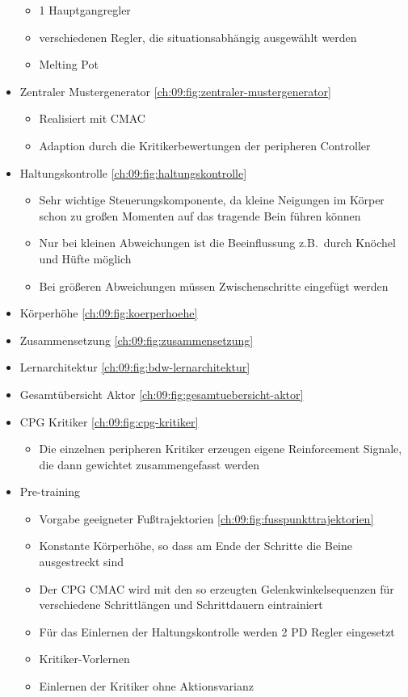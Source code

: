 \begin{itemize}
	\begin{itemize}
		\item 1 Hauptgangregler
		\item verschiedenen Regler, die situationsabhängig ausgewählt werden
		\item Melting Pot
	\end{itemize}
	\item Zentraler Mustergenerator \autoref{ch:09:fig:zentraler-mustergenerator}
	\begin{itemize}
		\item Realisiert mit CMAC
		\item Adaption durch die Kritikerbewertungen der peripheren Controller
	\end{itemize}
	\item Haltungskontrolle \autoref{ch:09:fig:haltungskontrolle}
	\begin{itemize}
		\item Sehr wichtige Steuerungskomponente, da kleine Neigungen im Körper schon zu großen Momenten auf das tragende Bein führen können
		\item Nur bei kleinen Abweichungen ist die Beeinflussung z.B.\ durch Knöchel und Hüfte möglich
		\item Bei größeren Abweichungen müssen Zwischenschritte eingefügt werden
	\end{itemize}
	\item Körperhöhe \autoref{ch:09:fig:koerperhoehe}
	\item Zusammensetzung \autoref{ch:09:fig:zusammensetzung}
	\item Lernarchitektur \autoref{ch:09:fig:bdw-lernarchitektur}
	\item Gesamtübersicht Aktor \autoref{ch:09:fig:gesamtuebersicht-aktor}
	\item CPG Kritiker \autoref{ch:09:fig:cpg-kritiker}
	\begin{itemize}
		\item Die einzelnen peripheren Kritiker erzeugen eigene Reinforcement Signale, die dann gewichtet zusammengefasst werden
	\end{itemize}
	\item Pre-training
	\begin{itemize}
		\item Vorgabe geeigneter Fußtrajektorien \autoref{ch:09:fig:fusspunkttrajektorien}
		\item Konstante Körperhöhe, so dass am Ende der Schritte die Beine ausgestreckt sind
		\item Der CPG CMAC wird mit den so erzeugten Gelenkwinkelsequenzen für verschiedene Schrittlängen und Schrittdauern eintrainiert
		\item Für das Einlernen der Haltungskontrolle  werden 2 PD Regler eingesetzt
		\item Kritiker-Vorlernen
		\item Einlernen der Kritiker ohne Aktionsvarianz
	\end{itemize}
\end{itemize}


